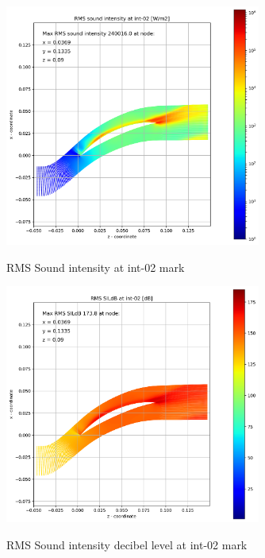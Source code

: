 \begin{figure}[ht]
  \centering
  \includegraphics[width=0.75\textwidth]{Figures/int-02-rms-sil.png} \label{int-02-rms-sil}
  \caption{RMS Sound intensity at int-02 mark}
  
  \vspace*{\floatsep}%

  \includegraphics[width=0.75\textwidth]{Figures/int-02-rms-sildb.png} \label{int-02-rms-sildb}
  \caption{RMS Sound intensity decibel level at int-02 mark}
\end{figure}

